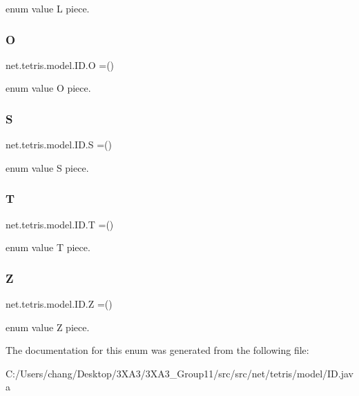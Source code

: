 enum value L piece. \label{enumnet_1_1tetris_1_1model_1_1_i_d_a31d2c5afa153ec0cc3897c5e366b591d} 
\subsubsection{O}
{\footnotesize\ttfamily net.\+tetris.\+model.\+I\+D.\+O =()}

enum value O piece. \label{enumnet_1_1tetris_1_1model_1_1_i_d_a2f9ec0e9e287a55fceda875d6a213973} 
\subsubsection{S}
{\footnotesize\ttfamily net.\+tetris.\+model.\+I\+D.\+S =()}

enum value S piece. \label{enumnet_1_1tetris_1_1model_1_1_i_d_aca3886b19165963acdb9eeb0ce15cd8c} 
\subsubsection{T}
{\footnotesize\ttfamily net.\+tetris.\+model.\+I\+D.\+T =()}

enum value T piece. \label{enumnet_1_1tetris_1_1model_1_1_i_d_a86950da78845d5feac983404ecbfed62} 
\subsubsection{Z}
{\footnotesize\ttfamily net.\+tetris.\+model.\+I\+D.\+Z =()}

enum value Z piece. 

The documentation for this enum was generated from the following file\+:\begin{DoxyCompactItemize}
\item 
C\+:/\+Users/chang/\+Desktop/3\+X\+A3/3\+X\+A3\+\_\+\+Group11/src/src/net/tetris/model/I\+D.\+java\end{DoxyCompactItemize}
